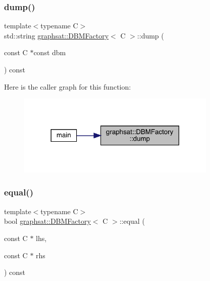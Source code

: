\mbox{\label{classgraphsat_1_1_d_b_m_factory_a700e1338dda1ba25930938b8f130ab80}} 
\subsubsection{\texorpdfstring{dump()}{dump()}}
{\footnotesize\ttfamily template$<$typename C$>$ \\
std\+::string \mbox{\hyperlink{classgraphsat_1_1_d_b_m_factory}{graphsat\+::\+D\+B\+M\+Factory}}$<$ C $>$\+::dump (\begin{DoxyParamCaption}\item[{const C $\ast$const}]{dbm }\end{DoxyParamCaption}) const\hspace{0.3cm}{\ttfamily [inline]}}

Here is the caller graph for this function\+:
\nopagebreak
\begin{figure}[H]
\begin{center}
\leavevmode
\includegraphics[width=270pt]{classgraphsat_1_1_d_b_m_factory_a700e1338dda1ba25930938b8f130ab80_icgraph}
\end{center}
\end{figure}
\mbox{\label{classgraphsat_1_1_d_b_m_factory_aa1bc76ac025370bd23ab04dfa761df75}} 
\subsubsection{\texorpdfstring{equal()}{equal()}}
{\footnotesize\ttfamily template$<$typename C$>$ \\
bool \mbox{\hyperlink{classgraphsat_1_1_d_b_m_factory}{graphsat\+::\+D\+B\+M\+Factory}}$<$ C $>$\+::equal (\begin{DoxyParamCaption}\item[{const C $\ast$}]{lhs,  }\item[{const C $\ast$}]{rhs }\end{DoxyParamCaption}) const\hspace{0.3cm}{\ttfamily [inline]}}

